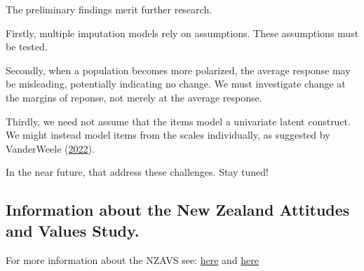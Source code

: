 \documentclass[
  singlecolumn]{report}
\begin{document}
The preliminary findings merit further research.

Firstly, multiple imputation models rely on assumptions. These
assumptions must be tested.

Secondly, when a population becomes more polarized, the average response
may be misleading, potentially indicating no change. We must investigate
change at the margins of reponse, not merely at the average response.

Thirdly, we need not assume that the items model a univariate latent
construct. We might instead model items from the scales individually, as
suggested by VanderWeele
(\protect\hyperlink{ref-vanderweele2022}{2022}).

In the near future, that address these challenges. Stay tuned!

\hypertarget{information-about-the-new-zealand-attitudes-and-values-study.}{%
\subsection{Information about the New Zealand Attitudes and Values
Study.}\label{information-about-the-new-zealand-attitudes-and-values-study.}}

For more information about the NZAVS see:
\href{https://www.psych.auckland.ac.nz/en/about/new-zealand-attitudes-and-values-study.html}{here}
and \href{https://go-bayes.github.io/reports/posts/nzavs/}{here}
\end{document}
